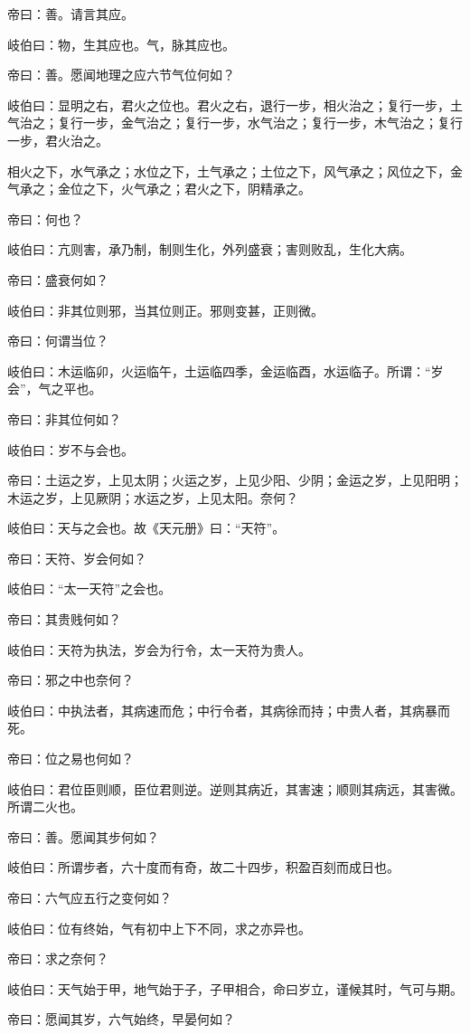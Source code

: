 \documentclass{article}%
\begin{document}
帝曰：善。请言其应。

岐伯曰：物，生其应也。气，脉其应也。

帝曰：善。愿闻地理之应六节气位何如？

岐伯曰：显明之右，君火之位也。君火之右，退行一步，相火治之；复行一步，土气治之；复行一步，金气治之；复行一步，水气治之；复行一步，木气治之；复行一步，君火治之。

相火之下，水气承之；水位之下，土气承之；土位之下，风气承之；风位之下，金气承之；金位之下，火气承之；君火之下，阴精承之。

帝曰：何也？

岐伯曰：亢则害，承乃制，制则生化，外列盛衰；害则败乱，生化大病。

帝曰：盛衰何如？

岐伯曰：非其位则邪，当其位则正。邪则变甚，正则微。

帝曰：何谓当位？

岐伯曰：木运临卯，火运临午，土运临四季，金运临酉，水运临子。所谓：“岁会”，气之平也。

帝曰：非其位何如？

岐伯曰：岁不与会也。

帝曰：土运之岁，上见太阴；火运之岁，上见少阳、少阴；金运之岁，上见阳明；木运之岁，上见厥阴；水运之岁，上见太阳。奈何？

岐伯曰：天与之会也。故《天元册》曰：“天符”。

帝曰：天符、岁会何如？

岐伯曰：“太一天符”之会也。

帝曰：其贵贱何如？

岐伯曰：天符为执法，岁会为行令，太一天符为贵人。

帝曰：邪之中也奈何？

岐伯曰：中执法者，其病速而危；中行令者，其病徐而持；中贵人者，其病暴而死。

帝曰：位之易也何如？

岐伯曰：君位臣则顺，臣位君则逆。逆则其病近，其害速；顺则其病远，其害微。所谓二火也。

帝曰：善。愿闻其步何如？

岐伯曰：所谓步者，六十度而有奇，故二十四步，积盈百刻而成日也。

帝曰：六气应五行之变何如？

岐伯曰：位有终始，气有初中上下不同，求之亦异也。

帝曰：求之奈何？

岐伯曰：天气始于甲，地气始于子，子甲相合，命曰岁立，谨候其时，气可与期。

帝曰：愿闻其岁，六气始终，早晏何如？
\end{document}
